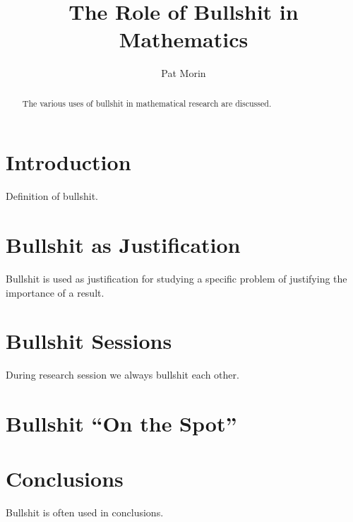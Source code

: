 \documentclass{article}
\title{The Role of Bullshit in Mathematics}
\author{Pat Morin}
\begin{document}
\begin{abstract}
The various uses of bullshit in mathematical research are discussed.
\end{abstract}


\section{Introduction}

Definition of bullshit.


\section{Bullshit as Justification}

Bullshit is used as justification for studying a specific problem of justifying
the importance of a result.

\section{Bullshit Sessions}

During research session we always bullshit each other.

\section{Bullshit ``On the Spot''}

\section{Conclusions}

Bullshit is often used in conclusions.
\end{document}

